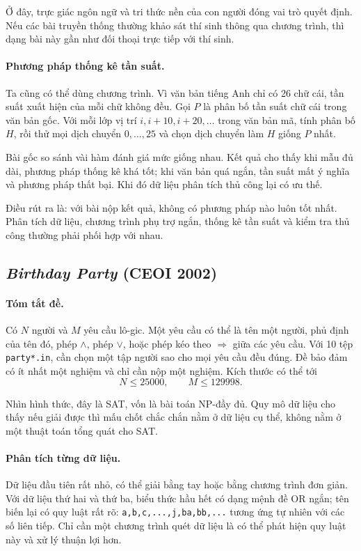 \documentclass[11pt]{article}
\begin{document}
Ở đây, trực giác ngôn ngữ và tri thức nền của con người đóng vai trò quyết
định. Nếu các bài truyền thống thường khảo sát thí sinh thông qua chương
trình, thì dạng bài này gần như đối thoại trực tiếp với thí sinh.

\paragraph{Phương pháp thống kê tần suất.}
Ta cũng có thể dùng chương trình. Vì văn bản tiếng Anh chỉ có 26 chữ cái, tần
suất xuất hiện của mỗi chữ không đều. Gọi \(P\) là phân bố tần suất chữ cái
trong văn bản gốc. Với mỗi lớp vị trí \(i,i+10,i+20,\ldots\) trong văn bản mã,
tính phân bố \(H\), rồi thử mọi dịch chuyển \(0,\ldots,25\) và chọn dịch
chuyển làm \(H\) giống \(P\) nhất.

Bài gốc so sánh vài hàm đánh giá mức giống nhau. Kết quả cho thấy khi mẫu đủ
dài, phương pháp thống kê khá tốt; khi văn bản quá ngắn, tần suất mất ý nghĩa
và phương pháp thất bại. Khi đó dữ liệu phân tích thủ công lại có ưu thế.

Điều rút ra là: với bài nộp kết quả, không có phương pháp nào luôn tốt nhất.
Phân tích dữ liệu, chương trình phụ trợ ngắn, thống kê tần suất và kiểm tra
thủ công thường phải phối hợp với nhau.

\subsection{\textit{Birthday Party} (CEOI 2002)}

\paragraph{Tóm tắt đề.}
Có \(N\) người và \(M\) yêu cầu lô-gic. Một yêu cầu có thể là tên một người,
phủ định của tên đó, phép \(\land\), phép \(\lor\), hoặc phép kéo theo
\(\Rightarrow\) giữa các yêu cầu. Với 10 tệp \texttt{party*.in}, cần chọn một
tập người sao cho mọi yêu cầu đều đúng. Đề bảo đảm có ít nhất một nghiệm và
chỉ cần nộp một nghiệm. Kích thước có thể tới
\[
  N\le 25000,\qquad M\le 129998.
\]

Nhìn hình thức, đây là SAT, vốn là bài toán NP-đầy đủ. Quy mô dữ liệu cho
thấy nếu giải được thì mấu chốt chắc chắn nằm ở dữ liệu cụ thể, không nằm ở
một thuật toán tổng quát cho SAT.

\paragraph{Phân tích từng dữ liệu.}
Dữ liệu đầu tiên rất nhỏ, có thể giải bằng tay hoặc bằng chương trình đơn
giản. Với dữ liệu thứ hai và thứ ba, biểu thức hầu hết có dạng mệnh đề OR
ngắn; tên biến lại có quy luật rất rõ: \texttt{a,b,c,...,j,ba,bb,...} tương
ứng tự nhiên với các số liên tiếp. Chỉ cần một chương trình quét dữ liệu là
có thể phát hiện quy luật này và xử lý thuận lợi hơn.
\end{document}
